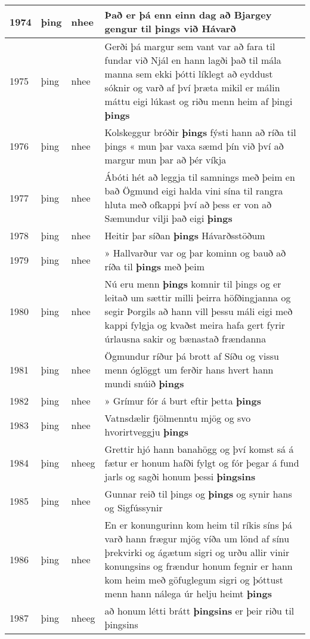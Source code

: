 \documentclass{article}
\begin{document}
\begin{longtable}{p{1cm}|p{1cm}|p{1cm}|p{13cm}}
\hline
1974&þing&nhee&Það er þá enn einn dag að Bjargey gengur til \textbf{þings} við Hávarð\\
\hline
1975&þing&nhee&Gerði þá margur sem vant var að fara til fundar við Njál en hann lagði það til mála manna sem ekki þótti líklegt að eyddust sóknir og varð af því þræta mikil er málin máttu eigi lúkast og riðu menn heim af þingi \textbf{þings} \\
\hline
1976&þing&nhee&Kolskeggur bróðir \textbf{þings} fýsti hann að ríða til þings « mun þar vaxa sæmd þín við því að margur mun þar að þér víkja\\
\hline
1977&þing&nhee&Ábóti hét að leggja til samnings með þeim en bað Ögmund eigi halda vini sína til rangra hluta með ofkappi því að þess er von að Sæmundur vilji það eigi \textbf{þings} \\
\hline
1978&þing&nhee&Heitir þar síðan \textbf{þings} Hávarðsstöðum\\
\hline
1979&þing&nhee&» Hallvarður var og þar kominn og bauð að ríða til \textbf{þings} með þeim\\
\hline
1980&þing&nhee&Nú eru menn \textbf{þings} komnir til þings og er leitað um sættir milli þeirra höfðingjanna og segir Þorgils að hann vill þessu máli eigi með kappi fylgja og kvaðst meira hafa gert fyrir úrlausna sakir og bænastað frændanna\\
\hline
1981&þing&nhee&Ögmundur ríður þá brott af Síðu og vissu menn óglöggt um ferðir hans hvert hann mundi snúið \textbf{þings} \\
\hline
1982&þing&nhee&» Grímur fór á burt eftir þetta \textbf{þings} \\
\hline
1983&þing&nhee&Vatnsdælir fjölmenntu mjög og svo hvorirtveggju \textbf{þings} \\
\hline
1984&þing&nheeg&Grettir hjó hann banahögg og því komst sá á fætur er honum hafði fylgt og fór þegar á fund jarls og sagði honum þessi \textbf{þingsins} \\
\hline
1985&þing&nhee&Gunnar reið til þings og \textbf{þings} og synir hans og Sigfússynir\\
\hline
1986&þing&nhee&En er konungurinn kom heim til ríkis síns þá varð hann frægur mjög víða um lönd af sínu þrekvirki og ágætum sigri og urðu allir vinir konungsins og frændur honum fegnir er hann kom heim með göfuglegum sigri og þóttust menn hann nálega úr helju heimt \textbf{þings} \\
\hline
1987&þing&nheeg&að honum létti brátt \textbf{þingsins} er þeir riðu til þingsins\\
\hline

\end{longtable}
\end{document}
